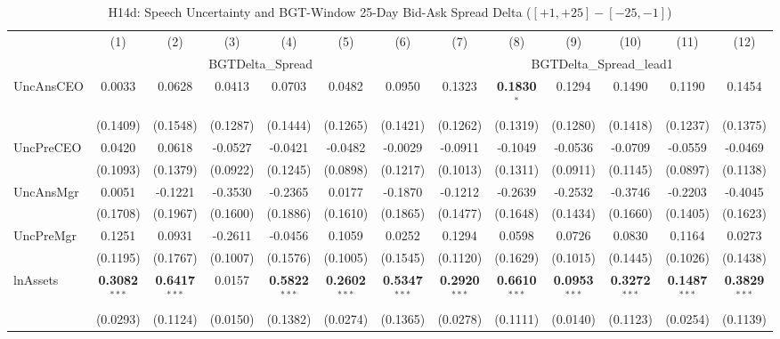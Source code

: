 \begin{landscape}
\begin{table}[H]
\setlength{\tabcolsep}{3pt}
\renewcommand{\arraystretch}{0.85}
\centering
\caption{H14d: Speech Uncertainty and BGT-Window 25-Day Bid-Ask Spread Delta ($[+1,+25]-[-25,-1]$)}
\label{tab:h14d}
\scriptsize
\begin{tabular}{lcccccccccccc}
\toprule
 & (1) & (2) & (3) & (4) & (5) & (6) & (7) & (8) & (9) & (10) & (11) & (12) \\
 & \multicolumn{6}{c}{BGTDelta\_Spread} & \multicolumn{6}{c}{BGTDelta\_Spread\_lead1} \\
\cmidrule(lr){2-7} \cmidrule(lr){8-13}
\midrule
UncAnsCEO & 0.0033 & 0.0628 & 0.0413 & 0.0703 & 0.0482 & 0.0950 & 0.1323 & \textbf{0.1830}$^{*}$ & 0.1294 & 0.1490 & 0.1190 & 0.1454 \\
 & (0.1409) & (0.1548) & (0.1287) & (0.1444) & (0.1265) & (0.1421) & (0.1262) & (0.1319) & (0.1280) & (0.1418) & (0.1237) & (0.1375) \\
UncPreCEO & 0.0420 & 0.0618 & -0.0527 & -0.0421 & -0.0482 & -0.0029 & -0.0911 & -0.1049 & -0.0536 & -0.0709 & -0.0559 & -0.0469 \\
 & (0.1093) & (0.1379) & (0.0922) & (0.1245) & (0.0898) & (0.1217) & (0.1013) & (0.1311) & (0.0911) & (0.1145) & (0.0897) & (0.1138) \\
UncAnsMgr & 0.0051 & -0.1221 & -0.3530 & -0.2365 & 0.0177 & -0.1870 & -0.1212 & -0.2639 & -0.2532 & -0.3746 & -0.2203 & -0.4045 \\
 & (0.1708) & (0.1967) & (0.1600) & (0.1886) & (0.1610) & (0.1865) & (0.1477) & (0.1648) & (0.1434) & (0.1660) & (0.1405) & (0.1623) \\
UncPreMgr & 0.1251 & 0.0931 & -0.2611 & -0.0456 & 0.1059 & 0.0252 & 0.1294 & 0.0598 & 0.0726 & 0.0830 & 0.1164 & 0.0273 \\
 & (0.1195) & (0.1767) & (0.1007) & (0.1576) & (0.1005) & (0.1545) & (0.1120) & (0.1629) & (0.1015) & (0.1445) & (0.1026) & (0.1438) \\
\midrule
lnAssets & \textbf{0.3082}$^{***}$ & \textbf{0.6417}$^{***}$ & 0.0157 & \textbf{0.5822}$^{***}$ & \textbf{0.2602}$^{***}$ & \textbf{0.5347}$^{***}$ & \textbf{0.2920}$^{***}$ & \textbf{0.6610}$^{***}$ & \textbf{0.0953}$^{***}$ & \textbf{0.3272}$^{***}$ & \textbf{0.1487}$^{***}$ & \textbf{0.3829}$^{***}$ \\
 & (0.0293) & (0.1124) & (0.0150) & (0.1382) & (0.0274) & (0.1365) & (0.0278) & (0.1111) & (0.0140) & (0.1123) & (0.0254) & (0.1139) \\

\end{tabular}
\end{table}
\end{landscape}
